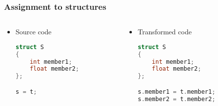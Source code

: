 \documentclass{beamer}
\begin{document}
\begin{frame}[fragile]
    \frametitle{Assignment to structures}

    \begin{columns}
        \begin{column}[]{0.5\textwidth}
            \begin{itemize}
                \item Source code
                      \begin{lstlisting}[language=C]
struct S
{
    int member1;
    float member2;
};

s = t;
                    \end{lstlisting}
            \end{itemize}

        \end{column}

        \begin{column}[]{0.5\textwidth}
            \begin{itemize}
                \item Transformed code
                      \begin{lstlisting}[language=C]
struct S
{
    int member1;
    float member2;
};

s.member1 = t.member1;
s.member2 = t.member2;
                \end{lstlisting}
            \end{itemize}
        \end{column}
    \end{columns}

\end{frame}
\end{document}
